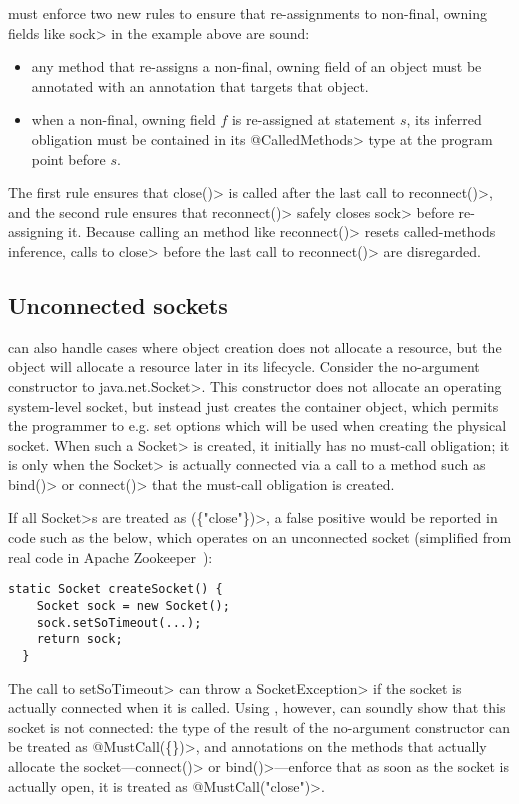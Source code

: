 \Tool must enforce two new rules to ensure that
re-assignments to non-final, owning fields like \<sock> in the example
above are sound:
\begin{itemize}
\item any method that re-assigns a non-final, owning field of an object
  must be annotated with an \CreatesObligation annotation
  that targets that object.
\item when a non-final, owning field $f$ is re-assigned at statement $s$,
  its inferred \MustCall obligation must be contained in its \<@CalledMethods>
  type at the program point before $s$.
\end{itemize}
\noindent
The first rule ensures that \<close()> is called after the last call
to \<reconnect()>, and the second rule ensures that \<reconnect()>
safely closes \<sock> before re-assigning it. Because calling
an \CreatesObligation method like \<reconnect()> resets called-methods
inference, calls to \<close> before the last call to \<reconnect()>
are disregarded.

\subsection{Unconnected sockets}
\label{sec:unconnected-sockets}
\CreatesObligation can also handle cases where object creation
does not allocate a resource, but the object will allocate a resource
later in its lifecycle. Consider the no-argument constructor
to \<java.net.Socket>. This constructor does not allocate an
operating system-level socket, but instead just creates the container
object, which permits the programmer to e.g. set options which will be used
when creating the physical socket. When such a \<Socket> is created, it
initially has no must-call obligation; it is only when the \<Socket> is
actually connected via a call to a method such as \<bind()>
or \<connect()> that the must-call obligation is created.

If all \<Socket>s are treated as \MustCall\<(\{"close"\})>,
a false positive would be reported
in code such as the below, which operates on an unconnected socket
(simplified from real code in Apache Zookeeper~\cite{zookeeper-create-socket}):

\begin{lstlisting}[frame=tb,belowskip=3mm]
  static Socket createSocket() {
    Socket sock = new Socket();
    sock.setSoTimeout(...);
    return sock;
  }
\end{lstlisting}

\noindent
The call to \<setSoTimeout> can throw a \<SocketException> if the
socket is actually connected when it is called. Using \CreatesObligation,
however, \tool can soundly show that this socket is not connected:
the type of the result of the no-argument constructor can be
treated as \<@MustCall(\{\})>, and \CreatesObligation annotations
on the methods that actually allocate the socket---\<connect()> or
\<bind()>---enforce that as soon as the socket is actually open,
it is treated as \<@MustCall("close")>.

